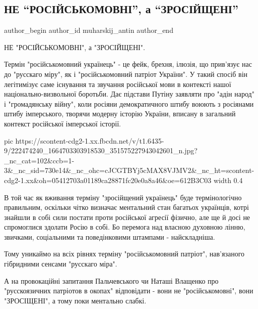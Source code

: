  
 
 
 
 
 
\subsection{НЕ \enquote{РОСІЙСЬКОМОВНІ}, а \enquote{ЗРОСІЙЩЕНІ}}
\label{sec:23_07_2021.fb.muharskij_antin.1.zrosijscheni}
 
\ifcmt
 author_begin
   author_id muharskij_antin
 author_end
\fi

НЕ "РОСІЙСЬКОМОВНІ", а "ЗРОСІЙЩЕНІ".

Термін "російськомовний українець" - це фейк, брехня, ілюзія, що прив'язує нас
до "русскаго міру", як і "російськомовний патріот України". У такий спосіб він
легітимізує саме існування та звучання російської мови в контексті нашої
національно-визвольної боротьби. Дає підстави Путіну заявляти про "адін народ"
і "громадянську війну", коли росіяни демократичного штибу воюють з росіянами
штибу імперського, творячи модерну історію України, вписану в загальний
контекст російської імперської історії. 

\ifcmt
  pic https://scontent-cdg2-1.xx.fbcdn.net/v/t1.6435-9/222474240_1664703303918530_351575227943042601_n.jpg?_nc_cat=102&ccb=1-3&_nc_sid=730e14&_nc_ohc=cJCGTBYj5cMAX8VJMV2&_nc_ht=scontent-cdg2-1.xx&oh=05412703a01189ca28871fc20e0a8a46&oe=612B3C03
  width 0.4
\fi

В той час як вживання терміну "зросійщений українець" буде термінологічно
правильним, оскільки чітко визначає ментальний стан багатьох українців, котрі
знайшли в собі сили постати проти російської агресії фізично, але ще й досі не
спромоглися здолати Росію в собі. Бо перемога над власною духовною лінню,
звичками, соціальними та поведінковими штампами - найскладніша. 

Тому уникаймо на всіх рівнях терміну "російськомовний патріот", нав'язаного
гібридними сенсами "русскаго міра". 

А на провокаційні запитання Пальчевського чи Наташі Влащенко про "русскоязичних
патріотов в окопах"  відповідати - вони не "російськомовні", вони "ЗРОСІЩЕНІ",
а тому поки ментально слабкі. 

